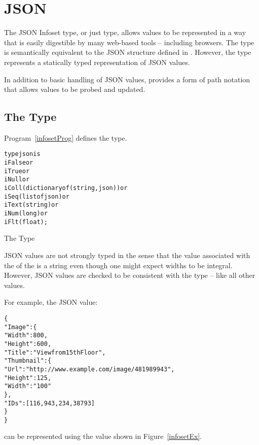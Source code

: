 \chapter{JSON}

The JSON Infoset type, or just  type, allows values to be represented in a way that is easily digestible by many web-based tools -- including browsers. The  type is semantically equivalent to the JSON structure defined in \cite{rfc4627}. However, the  type represents a statically typed representation of JSON values.

In addition to basic handling of JSON values, \Sr provides a form of path notation that allows  values to be probed and updated.

\section{The  Type}
\label{infosetType}

Program~\vref{infosetProg} defines the  type.
\begin{program}
\begin{alltt}
type json is 
      iFalse or
      iTrue or
      iNull or
      iColl(dictionary of (string,json)) or
      iSeq(list of json) or
      iText(string) or
      iNum(long) or
      iFlt(float);
\end{alltt}
\caption{The  Type\label{infosetProg}}
\end{program}

\begin{aside}
JSON values are not strongly typed in the sense that the value associated with the  of the  is a string even though one might expect widths to be integral. However, JSON values are checked to be consistent with the  type -- like all other values.
\end{aside}

For example, the JSON value:
\begin{alltt}
\{
  "Image": \{
    "Width":  800,
    "Height": 600,
    "Title":  "View from 15th Floor",
    "Thumbnail": \{
      "Url":    "http://www.example.com/image/481989943",
      "Height": 125,
      "Width":  "100"
    \},
    "IDs": [116, 943, 234, 38793]
  \}
\}
\end{alltt}
can be represented using the  value shown in Figure~\vref{infosetEx}.

